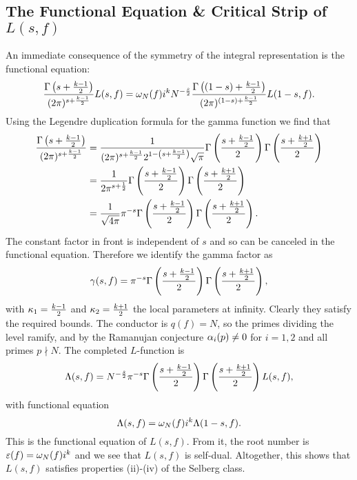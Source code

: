     \subsection*{The Functional Equation \& Critical Strip of \texorpdfstring{$L(s,f)$}{L(s,f)}}
      An immediate consequence of the symmetry of the integral representation is the functional equation:
      \[
        \frac{\Gamma\left(s+\frac{k-1}{2}\right)}{(2\pi)^{s+\frac{k-1}{2}}}L(s,f) = \omega_{N}(f)i^{k}N^{-\frac{s}{2}}\frac{\Gamma\left((1-s)+\frac{k-1}{2}\right)}{(2\pi)^{(1-s)+\frac{k-1}{2}}}L(1-s,f).
      \]
      Using the Legendre duplication formula for the gamma function we find that
      \begin{align*}
        \frac{\Gamma\left(s+\frac{k-1}{2}\right)}{(2\pi)^{s+\frac{k-1}{2}}} &= \frac{1}{(2\pi)^{s+\frac{k-1}{2}}2^{1-\left(s+\frac{k-1}{2}\right)}\sqrt{\pi}}\Gamma\left(\frac{s+\frac{k-1}{2}}{2}\right)\Gamma\left(\frac{s+\frac{k+1}{2}}{2}\right) \\
        &= \frac{1}{2\pi^{s+\frac{1}{2}}}\Gamma\left(\frac{s+\frac{k-1}{2}}{2}\right)\Gamma\left(\frac{s+\frac{k+1}{2}}{2}\right) \\ 
        &= \frac{1}{\sqrt{4\pi}}\pi^{-s}\Gamma\left(\frac{s+\frac{k-1}{2}}{2}\right)\Gamma\left(\frac{s+\frac{k+1}{2}}{2}\right).
      \end{align*}
      The constant factor in front is independent of $s$ and so can be canceled in the functional equation. Therefore we identify the gamma factor as
      \[
        \gamma(s,f) = \pi^{-s}\Gamma\left(\frac{s+\frac{k-1}{2}}{2}\right)\Gamma\left(\frac{s+\frac{k+1}{2}}{2}\right),
      \]
      with $\kappa_{1} = \frac{k-1}{2}$ and $\kappa_{2} = \frac{k+1}{2}$ the local parameters at infinity. Clearly they satisfy the required bounds. The conductor is $q(f) = N$, so the primes dividing the level ramify, and by the Ramanujan conjecture $\alpha_{i}(p) \neq 0$ for $i = 1,2$ and all primes $p \nmid N$. The completed $L$-function is
      \[
        \Lambda(s,f) = N^{-\frac{s}{2}}\pi^{-s}\Gamma\left(\frac{s+\frac{k-1}{2}}{2}\right)\Gamma\left(\frac{s+\frac{k+1}{2}}{2}\right)L(s,f),
      \]
      with functional equation
      \[
        \Lambda(s,f) = \omega_{N}(f)i^{k}\Lambda(1-s,f).
      \]
      This is the functional equation of $L(s,f)$. From it, the root number is $\varepsilon(f) = \omega_{N}(f)i^{k}$ and we see that $L(s,f)$ is self-dual. Altogether, this shows that $L(s,f)$ satisfies properties (ii)-(iv) of the Selberg class.

